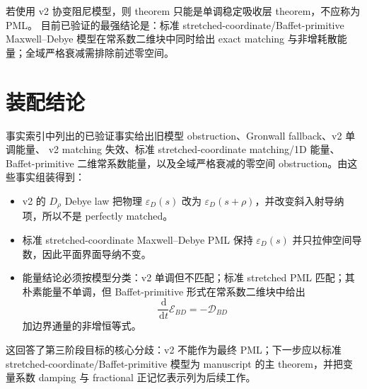 \documentclass[UTF8,a4paper,11pt]{ctexart}
\newcommand{\dd}{\,\mathrm d}
\newcommand{\Ecal}{\mathcal E}
\newcommand{\Dcal}{\mathcal D}
\newcommand{\eps}{\varepsilon}
\begin{document}
若使用 v2 协变阻尼模型，则 theorem 只能是单调稳定吸收层 theorem，不应称为 PML。
目前已验证的最强结论是：标准 stretched-coordinate/Baffet-primitive Maxwell--Debye
模型在常系数二维块中同时给出 exact matching 与非增耗散能量；全域严格衰减需排除前述零空间。

\section{装配结论}

事实索引中列出的已验证事实给出旧模型 obstruction、Gronwall fallback、v2 单调能量、
v2 matching 失效、标准 stretched-coordinate matching/1D 能量、Baffet-primitive 二维常系数能量，以及全域严格衰减的零空间 obstruction。由这些事实组装得到：

\begin{itemize}
\item v2 的 \(D_\rho\) Debye law 把物理 \(\eps_D(s)\) 改为 \(\eps_D(s+\rho)\)，并改变斜入射导纳项，所以不是 perfectly matched。
\item 标准 stretched-coordinate Maxwell--Debye PML 保持 \(\eps_D(s)\) 并只拉伸空间导数，因此平面界面导纳不变。
\item 能量结论必须按模型分类：v2 单调但不匹配；标准 stretched PML 匹配；其朴素能量不单调，但 Baffet-primitive 形式在常系数二维块中给出
\[
\frac{\dd}{\dd t}\Ecal_{BD}=-\Dcal_{BD}
\]
加边界通量的非增恒等式。
\end{itemize}

这回答了第三阶段目标的核心分歧：v2 不能作为最终 PML；下一步应以标准
stretched-coordinate/Baffet-primitive 模型为 manuscript 的主 theorem，并把变量系数
damping 与 fractional 正记忆表示列为后续工作。
\end{document}
